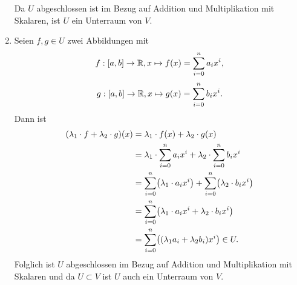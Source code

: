 \documentclass[german,12pt]{homework}
\newcommand{\RR}{\mathbb{R}}
\DeclarePairedDelimiter{\enbrace}{(}{)}
\DeclarePairedDelimiter{\benbrace}{[}{]}
\begin{document}
\begin{enumerate}
        Da \(U\) abgeschlossen ist im Bezug auf Addition und Multiplikation mit Skalaren, ist \(U\) ein Unterraum von \(V\).
        \item Seien \(f,g \in U\) zwei Abbildungen mit
        \[f: \benbrace*{a, b} \to \RR, x \mapsto f\enbrace*{x} = \sum_{i = 0}^na_ix^i,\]
        \[g: \benbrace*{a, b} \to \RR, x \mapsto g\enbrace*{x} = \sum_{i = 0}^nb_ix^i.\]
        Dann ist
        \begin{align*}
            \enbrace*{\lambda_1 \cdot f + \lambda_2 \cdot g}\enbrace*{x} &= \lambda_1 \cdot f\enbrace*{x} + \lambda_2 \cdot g\enbrace*{x}\\
            &= \lambda_1 \cdot \sum_{i = 0}^na_ix^i + \lambda_2 \cdot \sum_{i = 0}^nb_ix^i\\
            &= \sum_{i = 0}^n\enbrace*{\lambda_1 \cdot a_ix^i} + \sum_{i = 0}^n\enbrace*{\lambda_2 \cdot b_ix^i}\\
            &= \sum_{i = 0}^n\enbrace*{\lambda_1 \cdot a_ix^i + \lambda_2 \cdot b_ix^i}\\
            &= \sum_{i = 0}^n\enbrace*{\enbrace*{\lambda_1a_i + \lambda_2b_i}x^i} \in U.
        \end{align*}
        Folglich ist \(U\) abgeschlossen im Bezug auf Addition und Multiplikation mit Skalaren und da \(U \subset V\) ist \(U\) auch ein Unterraum von \(V\).
    \end{enumerate}
\end{document}
